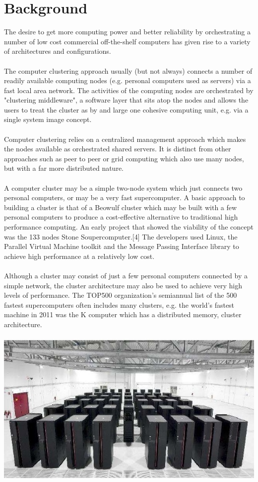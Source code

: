 \chapter{Background}


The desire to get more computing power and better reliability by orchestrating a number of low cost commercial off-the-shelf computers has given rise to a variety of architectures and configurations.
\\~\\
The computer clustering approach usually (but not always) connects a number of readily available computing nodes (e.g. personal computers used as servers) via a fast local area network. The activities of the computing nodes are orchestrated by "clustering middleware", a software layer that sits atop the nodes and allows the users to treat the cluster as by and large one cohesive computing unit, e.g. via a single system image concept.
\\~\\
Computer clustering relies on a centralized management approach which makes the nodes available as orchestrated shared servers. It is distinct from other approaches such as peer to peer or grid computing which also use many nodes, but with a far more distributed nature.
\\~\\
A computer cluster may be a simple two-node system which just connects two personal computers, or may be a very fast supercomputer. A basic approach to building a cluster is that of a Beowulf cluster which may be built with a few personal computers to produce a cost-effective alternative to traditional high performance computing. An early project that showed the viability of the concept was the 133 nodes Stone Soupercomputer.[4] The developers used Linux, the Parallel Virtual Machine toolkit and the Message Passing Interface library to achieve high performance at a relatively low cost.
\\~\\
Although a cluster may consist of just a few personal computers connected by a simple network, the cluster architecture may also be used to achieve very high levels of performance. The TOP500 organization's semiannual list of the 500 fastest supercomputers often includes many clusters, e.g. the world's fastest machine in 2011 was the K computer which has a distributed memory, cluster architecture.
\\~\\
\includegraphics[width=0.75\columnwidth]{./img.jpg} %

